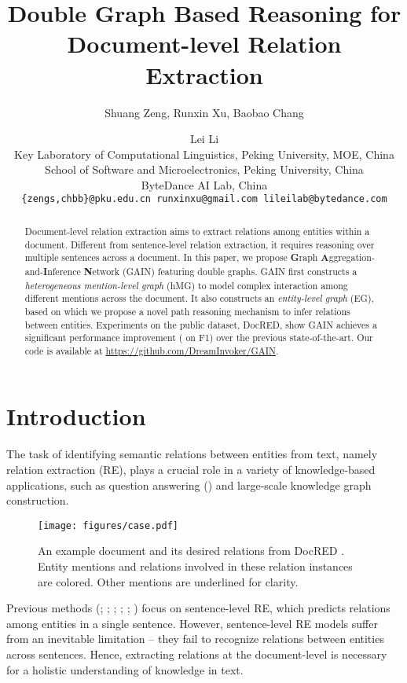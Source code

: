 \documentclass[11pt,a4paper]{article}
\title{Double Graph Based Reasoning for Document-level Relation Extraction}
\author{
  Shuang Zeng\footnotemark[1], 
  Runxin Xu\footnotemark[1], 
  Baobao Chang\footnotemark[2] \and 
  Lei Li\\
  Key Laboratory of Computational Linguistics, Peking University, MOE, China\\
  School of Software and Microelectronics, Peking University, China\\
  ByteDance AI Lab, China\\
  \texttt{
    \{zengs,chbb\}@pku.edu.cn runxinxu@gmail.com lileilab@bytedance.com
  }
}
\date{}
\begin{document}
\maketitle

\renewcommand{\thefootnote}{\fnsymbol{footnote}}   \renewcommand{\thefootnote}{\fnsymbol{footnote}}

\begin{abstract}




Document-level relation extraction aims to extract relations among entities within a document. 
Different from sentence-level relation extraction, it requires reasoning over multiple sentences across a document. 
In this paper, we propose \textbf{G}raph \textbf{A}ggregation-and-\textbf{I}nference \textbf{N}etwork (GAIN) featuring double graphs. 
GAIN first constructs a \textit{heterogeneous mention-level graph} (hMG) to model complex interaction among different mentions across the document. 
It also constructs an \textit{entity-level graph} (EG), based on which we propose a novel path reasoning mechanism to infer relations between entities. Experiments on the public dataset, DocRED, show GAIN achieves a significant performance improvement ( on F1) over the previous state-of-the-art. Our code is available at \url{https://github.com/DreamInvoker/GAIN}.


\end{abstract} \section{Introduction}
The task of identifying semantic relations between entities from text, namely relation extraction (RE), plays a crucial role in a variety of knowledge-based applications, such as question answering (\citealp{yu-etal-17-improved}) and large-scale knowledge graph construction.
\begin{figure}
    \centering
    \texttt{[image: figures/case.pdf]}
    \caption{An example document and its desired relations from DocRED \citep{yao-etal-19-docred}. Entity mentions and relations involved in these relation instances are colored. Other mentions are underlined for clarity.}
    \label{fig:running-example}
\end{figure}
Previous methods (\citealp{zeng-etal-14-relation}; \citealp{zeng-etal-15-distant}; \citealp{xiao-liu-16-semantic}; \citealp{zhang-etal-17-position}; \citealp{zhang-etal-18-graph}; \citealp{baldini-soares-etal-19-matching}) focus on sentence-level RE, which predicts relations among entities in a single sentence.
However, sentence-level RE models suffer from an inevitable limitation -- they fail to recognize relations between entities across sentences. 
Hence, extracting relations at the document-level is necessary for a holistic understanding of knowledge in text.
\end{document}
